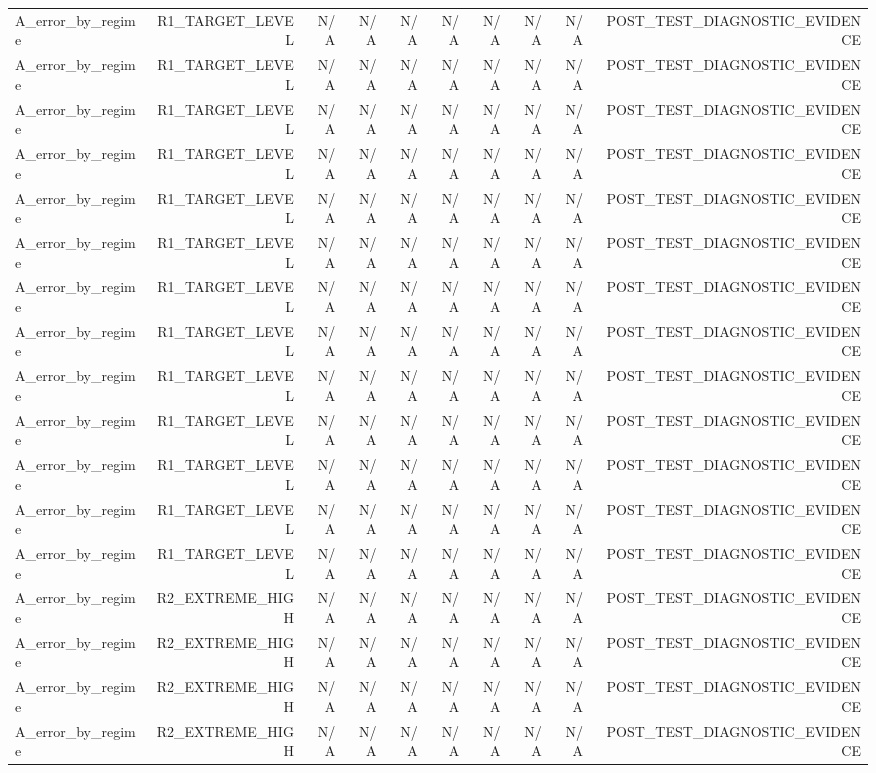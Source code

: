 \begin{table}[h!]
\begin{tabular}{lrrrrrrrrr}
A\_error\_by\_regime & R1\_TARGET\_LEVEL & N/A & N/A & N/A & N/A & N/A & N/A & N/A & POST\_TEST\_DIAGNOSTIC\_EVIDENCE \\
A\_error\_by\_regime & R1\_TARGET\_LEVEL & N/A & N/A & N/A & N/A & N/A & N/A & N/A & POST\_TEST\_DIAGNOSTIC\_EVIDENCE \\
A\_error\_by\_regime & R1\_TARGET\_LEVEL & N/A & N/A & N/A & N/A & N/A & N/A & N/A & POST\_TEST\_DIAGNOSTIC\_EVIDENCE \\
A\_error\_by\_regime & R1\_TARGET\_LEVEL & N/A & N/A & N/A & N/A & N/A & N/A & N/A & POST\_TEST\_DIAGNOSTIC\_EVIDENCE \\
A\_error\_by\_regime & R1\_TARGET\_LEVEL & N/A & N/A & N/A & N/A & N/A & N/A & N/A & POST\_TEST\_DIAGNOSTIC\_EVIDENCE \\
A\_error\_by\_regime & R1\_TARGET\_LEVEL & N/A & N/A & N/A & N/A & N/A & N/A & N/A & POST\_TEST\_DIAGNOSTIC\_EVIDENCE \\
A\_error\_by\_regime & R1\_TARGET\_LEVEL & N/A & N/A & N/A & N/A & N/A & N/A & N/A & POST\_TEST\_DIAGNOSTIC\_EVIDENCE \\
A\_error\_by\_regime & R1\_TARGET\_LEVEL & N/A & N/A & N/A & N/A & N/A & N/A & N/A & POST\_TEST\_DIAGNOSTIC\_EVIDENCE \\
A\_error\_by\_regime & R1\_TARGET\_LEVEL & N/A & N/A & N/A & N/A & N/A & N/A & N/A & POST\_TEST\_DIAGNOSTIC\_EVIDENCE \\
A\_error\_by\_regime & R1\_TARGET\_LEVEL & N/A & N/A & N/A & N/A & N/A & N/A & N/A & POST\_TEST\_DIAGNOSTIC\_EVIDENCE \\
A\_error\_by\_regime & R1\_TARGET\_LEVEL & N/A & N/A & N/A & N/A & N/A & N/A & N/A & POST\_TEST\_DIAGNOSTIC\_EVIDENCE \\
A\_error\_by\_regime & R1\_TARGET\_LEVEL & N/A & N/A & N/A & N/A & N/A & N/A & N/A & POST\_TEST\_DIAGNOSTIC\_EVIDENCE \\
A\_error\_by\_regime & R1\_TARGET\_LEVEL & N/A & N/A & N/A & N/A & N/A & N/A & N/A & POST\_TEST\_DIAGNOSTIC\_EVIDENCE \\
A\_error\_by\_regime & R2\_EXTREME\_HIGH & N/A & N/A & N/A & N/A & N/A & N/A & N/A & POST\_TEST\_DIAGNOSTIC\_EVIDENCE \\
A\_error\_by\_regime & R2\_EXTREME\_HIGH & N/A & N/A & N/A & N/A & N/A & N/A & N/A & POST\_TEST\_DIAGNOSTIC\_EVIDENCE \\
A\_error\_by\_regime & R2\_EXTREME\_HIGH & N/A & N/A & N/A & N/A & N/A & N/A & N/A & POST\_TEST\_DIAGNOSTIC\_EVIDENCE \\
A\_error\_by\_regime & R2\_EXTREME\_HIGH & N/A & N/A & N/A & N/A & N/A & N/A & N/A & POST\_TEST\_DIAGNOSTIC\_EVIDENCE \\

\end{tabular}
\end{table}
